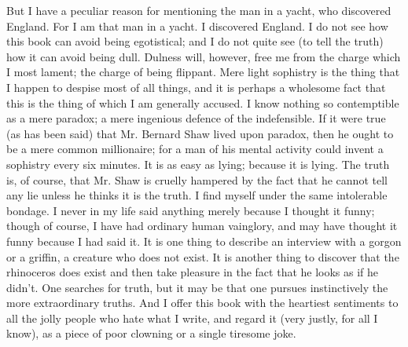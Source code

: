 But I have a peculiar reason for mentioning the man in a yacht, who discovered England. For I am that man in a yacht. I discovered England. I do not see how this book can avoid being egotistical; and I do not quite see (to tell the truth) how it can avoid being dull. Dulness will, however, free me from the charge which I most lament; the charge of being flippant. Mere light sophistry is the thing that I happen to despise most of all things, and it is perhaps a wholesome fact that this is the thing of which I am generally accused. I know nothing so contemptible as a mere paradox; a mere ingenious defence of the indefensible. If it were true (as has been said) that Mr. Bernard Shaw lived upon paradox, then he ought to be a mere common millionaire; for a man of his mental activity could invent a sophistry every six minutes. It is as easy as lying; because it is lying. The truth is, of course, that Mr. Shaw is cruelly hampered by the fact that he cannot tell any lie unless he thinks it is the truth. I find myself under the same intolerable bondage. I never in my life said anything merely because I thought it funny; though of course, I have had ordinary human vainglory, and may have thought it funny because I had said it. It is one thing to describe an interview with a gorgon or a griffin, a creature who does not exist. It is another thing to discover that the rhinoceros does exist and then take pleasure in the fact that he looks as if he didn’t. One searches for truth, but it may be that one pursues instinctively the more extraordinary truths. And I offer this book with the heartiest sentiments to all the jolly people who hate what I write, and regard it (very justly, for all I know), as a piece of poor clowning or a single tiresome joke.

